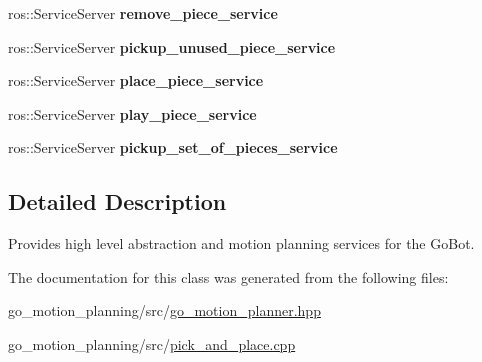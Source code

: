 \begin{DoxyCompactItemize}
\mbox{\label{classgo__motion__planner_a501d1bdebd834499d44f0871eb383023}} 
ros\+::\+Service\+Server {\bfseries remove\+\_\+piece\+\_\+service}
\item 
\mbox{\label{classgo__motion__planner_acebfcd65ac745bf93283e42ba9bc4f6e}} 
ros\+::\+Service\+Server {\bfseries pickup\+\_\+unused\+\_\+piece\+\_\+service}
\item 
\mbox{\label{classgo__motion__planner_afa40a53763c75833b68927e9c2d02f6c}} 
ros\+::\+Service\+Server {\bfseries place\+\_\+piece\+\_\+service}
\item 
\mbox{\label{classgo__motion__planner_a82f558953e429bef973c534fef819757}} 
ros\+::\+Service\+Server {\bfseries play\+\_\+piece\+\_\+service}
\item 
\mbox{\label{classgo__motion__planner_ab8d76cd26fa320f3ac579b14eb661b8b}} 
ros\+::\+Service\+Server {\bfseries pickup\+\_\+set\+\_\+of\+\_\+pieces\+\_\+service}
\end{DoxyCompactItemize}


\subsection{Detailed Description}
Provides high level abstraction and motion planning services for the Go\+Bot. 

The documentation for this class was generated from the following files\+:\begin{DoxyCompactItemize}
\item 
go\+\_\+motion\+\_\+planning/src/\hyperlink{go__motion__planner_8hpp}{go\+\_\+motion\+\_\+planner.\+hpp}\item 
go\+\_\+motion\+\_\+planning/src/\hyperlink{pick__and__place_8cpp}{pick\+\_\+and\+\_\+place.\+cpp}\end{DoxyCompactItemize}
